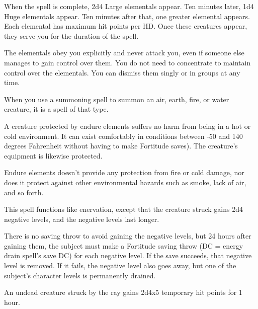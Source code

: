 \begin{multicols}{2}
\begin{small}
\smallskip\noindent When the spell is complete, 2d4 Large elementals appear. Ten minutes later, 1d4 Huge elementals appear. Ten minutes after that, one greater elemental appears. Each elemental has maximum hit points per HD. Once these creatures appear, they serve you for the duration of the spell.

\smallskip\noindent The elementals obey you explicitly and never attack you, even if someone else manages to gain control over them. You do not need to concentrate to maintain control over the elementals. You can dismiss them singly or in groups at any time.

\smallskip\noindent When you use a summoning spell to summon an air, earth, fire, or water creature, it is a spell of that type.

\noindent A creature protected by endure elements suffers no harm from being in a hot or cold environment. It can exist comfortably in conditions between -50 and 140 degrees Fahrenheit without having to make Fortitude saves). The creature's equipment is likewise protected.

\smallskip\noindent Endure elements doesn't provide any protection from fire or cold damage, nor does it protect against other environmental hazards such as smoke, lack of air, and so forth.

\noindent This spell functions like enervation, except that the creature struck gains 2d4 negative levels, and the negative levels last longer.

\smallskip\noindent There is no saving throw to avoid gaining the negative levels, but 24 hours after gaining them, the subject must make a Fortitude saving throw (DC = energy drain spell's save DC) for each negative level. If the save succeeds, that negative level is removed. If it fails, the negative level also goes away, but one of the subject's character levels is permanently drained.

\smallskip\noindent An undead creature struck by the ray gains 2d4x5 temporary hit points for 1 hour.


\end{small}
\end{multicols}
